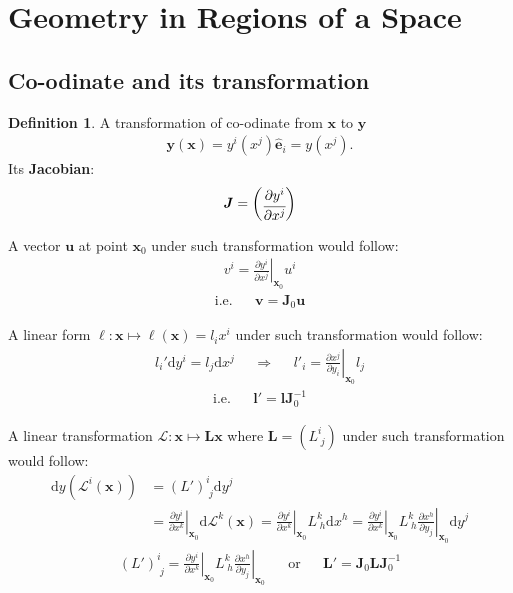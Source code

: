 \documentclass{article}
\theoremstyle{plain}
\theoremstyle{definition}
\newtheorem{dfn}{Definition}[section] %
\newcommand{\md}{\mathrm{d}}
\newcommand*{\basis}[1]{\hat{\boldsymbol{#1}}}
\newcommand*{\bv}{\boldsymbol}
\newcommand*{\bm}{\boldsymbol}
\newcommand*{\indexbf}[1]{\textbf{#1}\index{#1}}
\begin{document}
\tableofcontents
\newpage
\section{Geometry in Regions of a Space}
\subsection{Co-odinate and its transformation}
\begin{dfn}
A transformation of co-odinate from $\boldsymbol{x}$ to $\boldsymbol{y}$
\begin{align*}
	\bv y(\bv x ) = y^i(x^j)\basis e_i=y(x^j).
\end{align*}
Its \indexbf{Jacobian}:
\begin{align}\label{Jacobian of transformation}
	\bm J = 
	\begin{pmatrix}
		\cfrac{\partial y^i}{\partial x^j}
	\end{pmatrix}
\end{align}
\end{dfn}
A vector $\bv u$ at point $\bv x_0$ under such transformation would follow:
\begin{align}\label{vector}
	v^i = \left.\frac{\partial y^i}{\partial x^j}\right|_{\bv x_0} u^i
\end{align}
\begin{align*}
	\text{i.e.}&&
	\bv v = \bm J_0\bv u
\end{align*}

A linear form $\ell: \bv x\mapsto\ell(\bv x) =l_ix^i $ under such transformation would follow:
\begin{align}\label{linear form}
	l_i'\md y^i = l_j\md x^j 
	&&\Rightarrow&&
	l'_i = \left.\frac{\partial x^j}{\partial y_i}\right|_{\bv x_0}l_j
\end{align}
\begin{align*}
	\text{i.e.}&&
	\bv l' = \bv l \bm J^{-1}_0
\end{align*}

A linear transformation $\mathscr{L}:\bv x \mapsto \bm L\bv x$ where $\bm L = \left( L^i_{\;j}\right)$ under such transformation would follow:
\begin{align*}
	\md y\left(\mathscr L^i(\bv x)\right) 
	&=(L')^i_{\;j} \md y^j 
	\\
	&=  \left.\frac{\partial y^i}{\partial x^k}\right|_{\bv x_0} \md \mathscr L^k (\bv x)
	=\left.\frac{\partial y^i}{\partial x^k}\right|_{\bv x_0} L^k_{\;h} \md x^h
	=\left.\frac{\partial y^i}{\partial x^k}\right|_{\bv x_0} 
	L^k_{\;h} 
	\left.\frac{\partial x^h}{\partial y_j}\right|_{\bv x_0}\md y^j
\end{align*} 
\begin{align}\label{linear transformation} 
	(L')^i_{\;j} = 
	\left.\frac{\partial y^i}{\partial x^k}\right|_{\bv x_0} 
	L^k_{\;h} 
	\left.\frac{\partial x^h}{\partial y_j}\right|_{\bv x_0} 
	&&\text{or}&&
	\bm L'  = \bm J_0\bm L\bm J^{-1}_0 
\end{align} 
\end{document}
